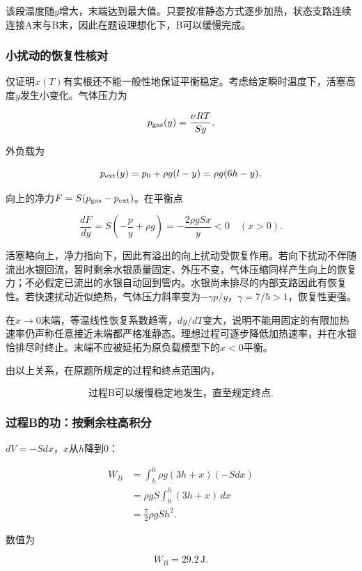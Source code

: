 \documentclass[12pt,a4paper,fontset=fandol]{ctexart}
\begin{document}
该段温度随\(y\)增大，末端达到最大值。只要按准静态方式逐步加热，状态支路连续连接A末与B末，因此在题设理想化下，B可以缓慢完成。

\subsubsection{小扰动的恢复性核对}\label{ux5c0fux6270ux52a8ux7684ux6062ux590dux6027ux6838ux5bf9}

仅证明\(x(T)\)有实根还不能一般性地保证平衡稳定。考虑给定瞬时温度下，活塞高度\(y\)发生小变化。气体压力为

\[
p_{\rm gas}(y)=\frac{\nu RT}{Sy},
\]

外负载为

\[
p_{\rm ext}(y)=p_0+\rho g(l-y)=\rho g(6h-y).
\]

向上的净力\(F=S(p_{\rm gas}-p_{\rm ext})\)。在平衡点

\[
\frac{dF}{dy}
=S\left(-\frac p y+\rho g\right)
=-\frac{2\rho gSx}{y}<0
\quad(x>0).
\]

活塞略向上，净力指向下，因此有溢出的向上扰动受恢复作用。若向下扰动不伴随流出水银回流，暂时剩余水银质量固定、外压不变，气体压缩同样产生向上的恢复力；不必假定已流出的水银自动回到管内。水银尚未排尽的内部支路因此有恢复性。若快速扰动近似绝热，气体压力斜率变为\(-\gamma p/y\)，\(\gamma=7/5>1\)，恢复性更强。

在\(x\to0\)末端，等温线性恢复系数趋零，\(dy/dT\)变大，说明不能用固定的有限加热速率仍声称任意接近末端都严格准静态。理想过程可逐步降低加热速率，并在水银恰排尽时终止。末端不应被延拓为原负载模型下的\(x<0\)平衡。

由以上关系，在原题所规定的过程和终点范围内，

\[
\boxed{\text{过程B可以缓慢稳定地发生，直至规定终点}}.
\]

\subsubsection{过程B的功：按剩余柱高积分}\label{ux8fc7ux7a0bbux7684ux529fux6309ux5269ux4f59ux67f1ux9ad8ux79efux5206}

\(dV=-Sdx\)，\(x\)从\(h\)降到0：

\[
\begin{aligned}
W_B
&=\int_h^0\rho g(3h+x)(-Sdx)\\
&=\rho gS\int_0^h(3h+x)\,dx\\
&=\frac72\rho gSh^2.
\end{aligned}
\]

数值为

\[
\boxed{W_B=29.2\,\mathrm J}.
\]
\end{document}
